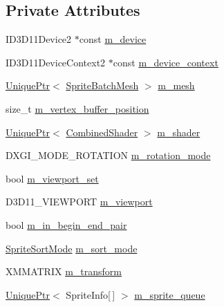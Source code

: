\subsection*{Private Attributes}
\begin{DoxyCompactItemize}
\item 
I\+D3\+D11\+Device2 $\ast$const \hyperlink{classmage_1_1_sprite_batch_abde468ebc16bebb86c9204f69258d196}{m\+\_\+device}
\item 
I\+D3\+D11\+Device\+Context2 $\ast$const \hyperlink{classmage_1_1_sprite_batch_a95d4de79a01ffe5603a2cfa2eddd53b7}{m\+\_\+device\+\_\+context}
\item 
\hyperlink{namespacemage_a8c307fbcc33bce9b7f2aa4c26c3b95cf}{Unique\+Ptr}$<$ \hyperlink{classmage_1_1_sprite_batch_mesh}{Sprite\+Batch\+Mesh} $>$ \hyperlink{classmage_1_1_sprite_batch_a8e333637fa0af0858fd3a3efa1e59c3a}{m\+\_\+mesh}
\item 
size\+\_\+t \hyperlink{classmage_1_1_sprite_batch_afd6af84ab6728bfa907e6b8153357585}{m\+\_\+vertex\+\_\+buffer\+\_\+position}
\item 
\hyperlink{namespacemage_a8c307fbcc33bce9b7f2aa4c26c3b95cf}{Unique\+Ptr}$<$ \hyperlink{structmage_1_1_combined_shader}{Combined\+Shader} $>$ \hyperlink{classmage_1_1_sprite_batch_a71bd46fc89d20605fbc2e3390d02be0e}{m\+\_\+shader}
\item 
D\+X\+G\+I\+\_\+\+M\+O\+D\+E\+\_\+\+R\+O\+T\+A\+T\+I\+ON \hyperlink{classmage_1_1_sprite_batch_ae062f178efe4a3af9c1573f8f8c4deee}{m\+\_\+rotation\+\_\+mode}
\item 
bool \hyperlink{classmage_1_1_sprite_batch_aefa38f98b30d09e3521ccdcc12bac6d0}{m\+\_\+viewport\+\_\+set}
\item 
D3\+D11\+\_\+\+V\+I\+E\+W\+P\+O\+RT \hyperlink{classmage_1_1_sprite_batch_a3029ab1ee01ccfc69fef88eb78d5bfc0}{m\+\_\+viewport}
\item 
bool \hyperlink{classmage_1_1_sprite_batch_a2f4e56ee07ef37a2906c552b0ea78403}{m\+\_\+in\+\_\+begin\+\_\+end\+\_\+pair}
\item 
\hyperlink{namespacemage_a256fa5833eecc408923de7ffadb5e014}{Sprite\+Sort\+Mode} \hyperlink{classmage_1_1_sprite_batch_a0b2b16b0d9eb63501b6fc0f9ce85e022}{m\+\_\+sort\+\_\+mode}
\item 
X\+M\+M\+A\+T\+R\+IX \hyperlink{classmage_1_1_sprite_batch_ad8a12f1f6c8289548346d469c9436c58}{m\+\_\+transform}
\item 
\hyperlink{namespacemage_a8c307fbcc33bce9b7f2aa4c26c3b95cf}{Unique\+Ptr}$<$ Sprite\+Info\mbox{[}$\,$\mbox{]} $>$ \hyperlink{classmage_1_1_sprite_batch_a67ab116e403b626771f03f527efa6f2f}{m\+\_\+sprite\+\_\+queue}

\end{DoxyCompactItemize}

